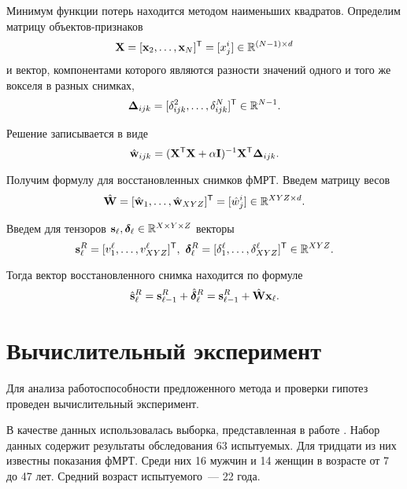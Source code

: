 \documentclass[a4paper, 12pt]{extarticle}
\begin{document}
Минимум функции потерь находится методом наименьших квадратов. Определим матрицу объектов-признаков
\begin{equation}
	\label{eq10}
	\mathbf{X} = [\mathbf{x}_2, \ldots, \mathbf{x}_N]^{\mathsf{T}} = [x^i_j] \in \mathbb{R}^{(N-1) \times d}
\end{equation}
и вектор, компонентами которого являются разности значений одного и того же вокселя в разных снимках,
\begin{equation}
	\label{eq11}
	\mathbf{\Delta}_{ijk} = [\delta^2_{ijk}, \ldots, \delta^N_{ijk}]^{\mathsf{T}} \in \mathbb{R}^{N-1}.
\end{equation}

Решение записывается в виде
\begin{equation}
	\label{eq12}
	\hat{\mathbf{w}}_{ijk} = (\mathbf{X}^{\mathsf{T}} \mathbf{X} + \alpha \mathbf{I})^{-1} \mathbf{X}^{\mathsf{T}} \mathbf{\Delta}_{ijk}.
\end{equation}

Получим формулу для восстановленных снимков фМРТ. Введем матрицу весов
\begin{equation}
	\label{eq13}
	\hat{\mathbf{W}} = [\hat{\mathbf{w}}_1, \ldots, \hat{\mathbf{w}}_{XYZ}]^{\mathsf{T}} = [\hat{w}^i_j] \in \mathbb{R}^{XYZ \times d}.
\end{equation}

Введем для тензоров $\mathbf{s}_{\ell}, \boldsymbol{\delta}_{\ell} \in \mathbb{R}^{X \times Y \times Z}$ векторы
\[ \mathbf{s}_{\ell}^{R} = [ v^{\ell}_1, \ldots, v^{\ell}_{XYZ} ]^{\mathsf{T}},\
	\boldsymbol{\delta}_{\ell}^{R} = [ \delta^{\ell}_1, \ldots, \delta^{\ell}_{XYZ} ]^{\mathsf{T}} \in \mathbb{R}^{XYZ}. \]

Тогда вектор восстановленного снимка находится по формуле
\begin{equation}
	\label{eq14}
	\hat{\mathbf{s}}_{\ell}^{R} = \mathbf{s}_{\ell-1}^{R} + \hat{\boldsymbol{\delta}}_{\ell}^{R} = \mathbf{s}_{\ell-1}^{R} + \hat{\mathbf{W}} \mathbf{x}_{\ell}.
\end{equation}

\section{Вычислительный эксперимент}

Для анализа работоспособности предложенного метода и проверки гипотез
проведен вычислительный эксперимент.

В качестве данных использовалась выборка, представленная в работе \citep{Berezutskaya2022}.
Набор данных содержит результаты обследования 63 испытуемых.
Для тридцати из них известны показания фМРТ.
Среди них 16 мужчин и 14 женщин в возрасте от 7 до 47 лет.
Средний возраст испытуемого~--- 22 года.
\end{document}
